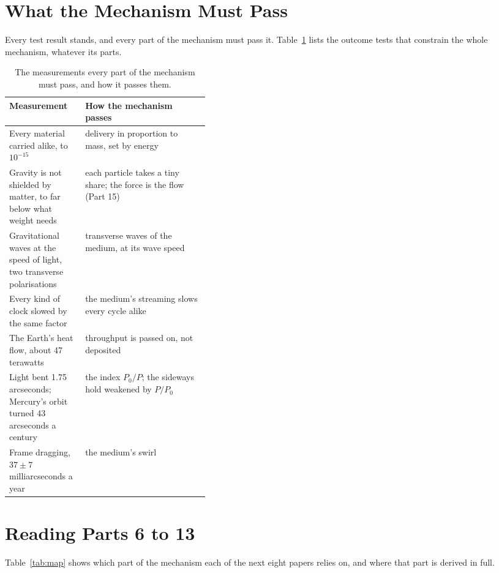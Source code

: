 \documentclass[11pt,a4paper]{article}
\begin{document}
\section{What the Mechanism Must Pass}

 Every test result stands, and every part of the mechanism must pass it. Table~\ref{tab:pass} lists the outcome tests that constrain the whole mechanism, whatever its parts.

\begin{table}[t]\centering\small
\caption{The measurements every part of the mechanism must pass, and how it passes them.}
\begin{tabularx}{\linewidth}{@{}>{\raggedright}p{0.38\linewidth} X@{}}\toprule
\textbf{Measurement} & \textbf{How the mechanism passes}\\\midrule
Every material carried alike, to $10^{-15}$ \citep{touboul2022} & delivery in proportion to mass, set by energy\\
Gravity is not shielded by matter, to far below what weight needs & each particle takes a tiny share; the force is the flow (Part 15)\\
Gravitational waves at the speed of light, two transverse polarisations \citep{abbott2017speed} & transverse waves of the medium, at its wave speed\\
Every kind of clock slowed by the same factor \citep{chou2010,bailey1977} & the medium's streaming slows every cycle alike\\
The Earth's heat flow, about 47 terawatts & throughput is passed on, not deposited\\
Light bent 1.75 arcseconds; Mercury's orbit turned 43 arcseconds a century & the index $P_0/P$; the sideways hold weakened by $P/P_0$\\
Frame dragging, $37\pm7$ milliarcseconds a year \citep{everitt2011} & the medium's swirl\\\bottomrule
\end{tabularx}\label{tab:pass}\end{table}

\section{Reading Parts 6 to 13}

Table~\ref{tab:map} shows which part of the mechanism each of the next eight papers relies on, and where that part is derived in full.
\end{document}
